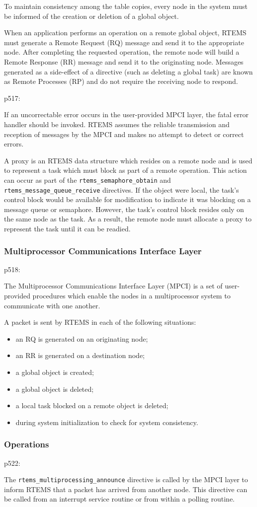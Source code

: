 To maintain consistency among the table copies,
every node in the system must be informed
of the creation or deletion of a global object.

When an application performs an operation on a remote global object,
RTEMS must generate a Remote Request (RQ) message
and send it to the appropriate node.
After completing the requested operation,
the remote node will build a Remote Response (RR) message
and send it to the originating node.
Messages generated as a side-effect of a directive
(such as deleting a global task)
are known as Remote Processes (RP)
and do not require the receiving node to respond.

p517:

If an uncorrectable error occurs in the user-provided MPCI layer,
the fatal error handler should be invoked.
RTEMS assumes the reliable transmission and reception of messages
by the MPCI and makes no attempt to detect or correct errors.

A proxy is an RTEMS data structure which resides on a remote node
and is used to represent a task which must block as part of a remote operation.
This action can occur as part of the \verb"rtems_semaphore_obtain"
and \verb"rtems_message_queue_receive" directives.
If the object were local,
the task’s control block would be available for modification
to indicate it was blocking on a message queue or semaphore.
However,
the task’s control block resides only on the same node as the task.
As a result,
the remote node must allocate a proxy to represent the task
until it can be readied.

\subsubsection{Multiprocessor Communications Interface Layer}

p518:

The Multiprocessor Communications Interface Layer (MPCI)
is a set of user-provided procedures
which enable the nodes in a multiprocessor system
to communicate with one another.

A packet is sent by RTEMS in each of the following situations:
\begin{itemize}
  \item an RQ is generated on an originating node;
  \item an RR is generated on a destination node;
  \item a global object is created;
  \item a global object is deleted;
  \item a local task blocked on a remote object is deleted;
  \item during system initialization to check for system consistency.
\end{itemize}

\subsubsection{Operations}


p522:

The \verb"rtems_multiprocessing_announce" directive is called by the MPCI layer
to inform RTEMS that a packet has arrived from another node.
This directive can be called from
an interrupt service routine
or from within a polling routine.
